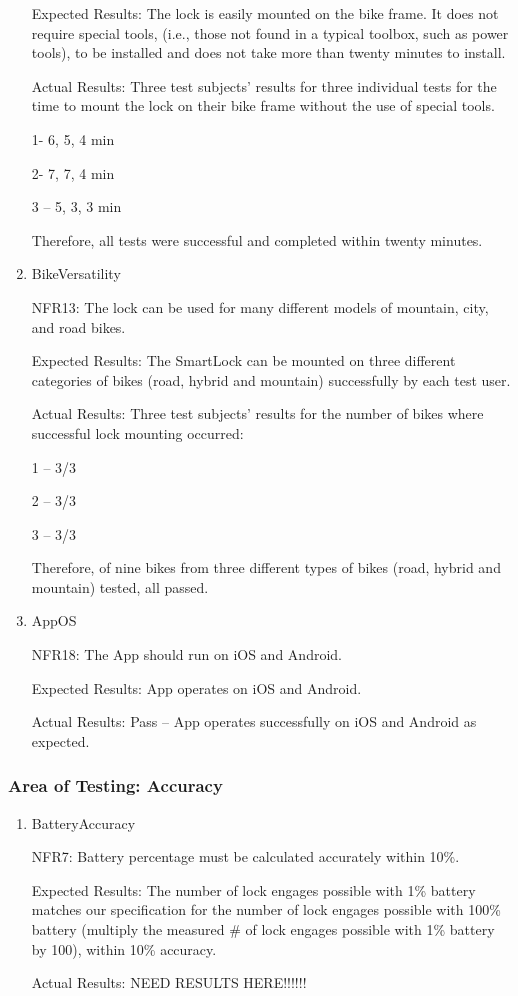 \documentclass[12pt, titlepage]{article}
\begin{document}
\begin{enumerate}
Expected Results: The lock is easily mounted on the bike frame. It does not require special tools, (i.e., those not found in a typical toolbox, such as power tools), to be installed and does not take more than twenty minutes to install.  

Actual Results: Three test subjects’ results for three individual tests for the time to mount the lock on their bike frame without the use of special tools.  

1- 6, 5, 4 min 

2- 7, 7, 4 min 

3 – 5, 3, 3 min 

Therefore, all tests were successful and completed within twenty minutes. 

\item{BikeVersatility

NFR13: The lock can be used for many different models of mountain, city, and road bikes.  }

Expected Results: The SmartLock can be mounted on three different categories of bikes (road, hybrid and mountain) successfully by each test user.  

Actual Results: Three test subjects’ results for the number of bikes where successful lock mounting occurred: 

1 – 3/3 

2 – 3/3 

3 – 3/3 

Therefore, of nine bikes from three different types of bikes (road, hybrid and mountain) tested, all passed. 

\item{AppOS

NFR18: The App should run on iOS and Android.  }

Expected Results: App operates on iOS and Android. 

Actual Results: Pass -- App operates successfully on iOS and Android as expected. 

\end{enumerate}

\subsubsection{Area of Testing: Accuracy}

\begin{enumerate}

\item{BatteryAccuracy

NFR7: Battery percentage must be calculated accurately within 10\%. }

Expected Results: The number of lock engages possible with 1\% battery matches our specification for the number of lock engages possible with 100\% battery (multiply the measured \# of lock engages possible with 1\% battery by 100), within 10\% accuracy.

Actual Results: NEED RESULTS HERE!!!!!!

\end{enumerate}
	
\end{document}
